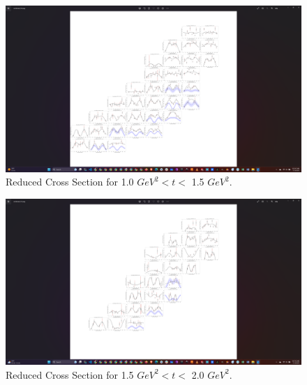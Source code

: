 \begin{figure}[ht]
    \centering
    \includegraphics[trim={14.8cm 4cm 18.5cm 4cm},clip,width=\textwidth]{Chapters/Ch4-BaseAnalysis/bin_by_bin_cross_sections/pics_screenshots/t_10.png}
    \caption[Reduced Cross Section for 1.0 $GeV^2 < t <$ 1.5 $GeV^2$]{Reduced Cross Section for 1.0 $GeV^2 < t <$ 1.5 $GeV^2$.}
    \label{fig:combined_t1.0}
\end{figure}

\begin{figure}[ht]
    \centering
    \includegraphics[trim={18.8cm 4cm 18.5cm 4cm},clip,width=\textwidth]{Chapters/Ch4-BaseAnalysis/bin_by_bin_cross_sections/pics_screenshots/t15.png}
    \caption[Reduced Cross Section for 1.5 $GeV^2 < t <$ 2.0 $GeV^2$]{Reduced Cross Section for 1.5 $GeV^2 < t <$ 2.0 $GeV^2$.}
    \label{fig:combined_t1.5}
\end{figure}

